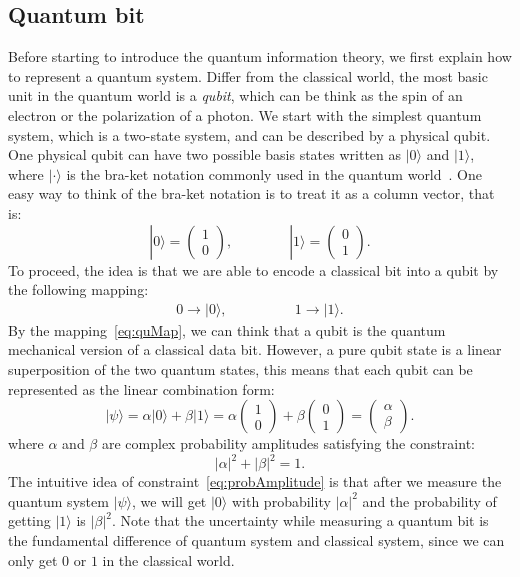 \subsection{Quantum bit}
Before starting to introduce the quantum information theory, we first explain how to represent a quantum system.
Differ from the classical world, the most basic unit in the quantum world is a {\it{qubit}}, which can be think as the spin of an electron or the polarization of a photon.
We start with the simplest quantum system, which is a two-state system, and can be described by a physical qubit.
One physical qubit can have two possible basis states written as $|0\rangle$ and $|1\rangle$, where $| \cdot \rangle$ is the bra-ket notation commonly used in the quantum world~\cite{BraKet}.
One easy way to think of the bra-ket notation is to treat it as a column vector, that is:
\begin{equation}\label{eq:braKet}
|0\rangle = \begin{pmatrix} 1 \\ 0 \end{pmatrix}, \quad \quad \quad \quad
|1\rangle = \begin{pmatrix} 0 \\ 1 \end{pmatrix}.
\end{equation}
To proceed, the idea is that we are able to encode a classical bit into a qubit by the following mapping:
\begin{align}\label{eq:quMap}
0 \to |0\rangle,\quad \quad \quad \quad &1 \to |1\rangle.
\end{align}
By the mapping~\eqref{eq:quMap}, we can think that a qubit is the quantum mechanical version of a classical data bit.
However, a pure qubit state is a linear superposition of the two quantum states, this means that each qubit can be represented as the linear combination form:
\begin{equation}\label{eq:qubit}
|\psi\rangle = \alpha |0\rangle + \beta |1\rangle = 
\alpha\begin{pmatrix} 1 \\ 0 \end{pmatrix} +
\beta\begin{pmatrix} 0 \\ 1 \end{pmatrix}
= \begin{pmatrix} \alpha \\ \beta \end{pmatrix}.
\end{equation}
where $\alpha$ and $\beta$ are complex probability amplitudes satisfying the constraint:
\begin{equation}\label{eq:probAmplitude}
|\alpha|^2 + |\beta|^2 = 1.
\end{equation}
The intuitive idea of constraint~\eqref{eq:probAmplitude} is that after we measure the quantum system $|\psi\rangle$, we will get $|0\rangle$ with probability $|\alpha|^2$ and the probability of getting $|1\rangle$ is $|\beta|^2$.
Note that the uncertainty while measuring a quantum bit is the fundamental difference of quantum system and classical system, since we can only get $0$ or $1$ in the classical world.
